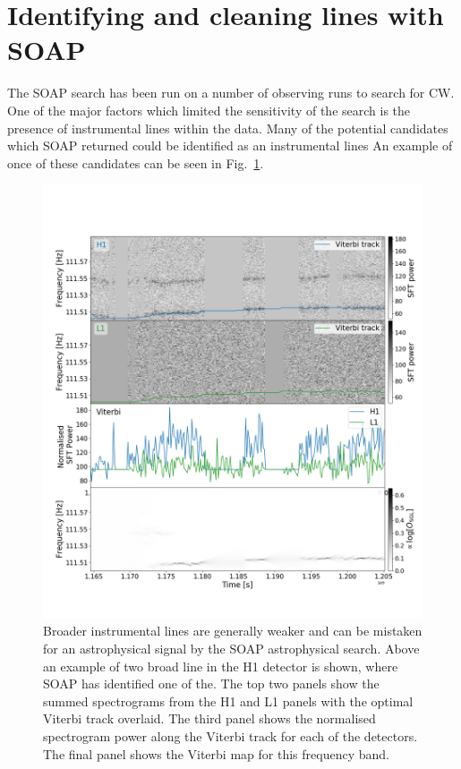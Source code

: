 \clearpage

\section{\label{detchar:soap}Identifying and cleaning lines with SOAP}

% 
The SOAP search has been run on a number of observing runs to search for \gls{CW}. 
One of the major factors which limited the sensitivity of the search is the presence of instrumental lines within the data. 
Many of the potential candidates which SOAP returned could be identified as an instrumental lines 
An example of once of these candidates can be seen in Fig.~\ref{detchar:soap:astrowander}.
%
\begin{figure}[h]
	\includegraphics[width=\textwidth]{C5_detchar/plot_F111_5_wandering_line.png}
	\caption[Broad wandering line example.]{Broader instrumental lines are generally weaker and can be mistaken for an astrophysical signal by the SOAP astrophysical search. Above an example of two broad line in the H1 detector is shown, where SOAP has identified one of the. The top two panels show the summed spectrograms from the H1 and L1 panels with the optimal Viterbi track overlaid. The third panel shows the normalised spectrogram power along the Viterbi track for each of the detectors. The final panel shows the Viterbi map for this frequency band.}
	\label{detchar:soap:astrowander}
\end{figure}

